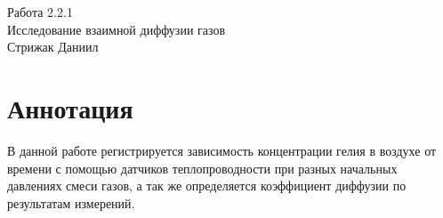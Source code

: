 




\begin{center}
  \LARGE{Работа 2.2.1}\\[0.2cm]
  \LARGE{Исследование взаимной диффузии газов}\\[0.2cm]
  \large{Стрижак Даниил}\\[0.2cm]
\end{center}  
  
\section{Аннотация}
В данной работе регистрируется зависимость концентрации гелия в воздухе от времени с помощью датчиков теплопроводности при разных начальных давлениях смеси газов, а так же определяется коэффициент диффузии по результатам измерений.


